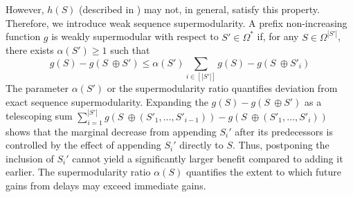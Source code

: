 \documentclass{article} %
\begin{document}
However, $h(S)$ (described in ) may not, in general, satisfy this property. Therefore, we introduce weak sequence supermodularity. A prefix non-increasing function $g$ is weakly supermodular with respect to $S' \in \Omega^*$ if, for any $S \in \Omega^{|S'|}$, there exists $\alpha(S') \geq 1$ such that
\begin{equation}\label{eqn:alpha_supermod}
     g(S) - g(S\ \oplus S') \leq \alpha(S') \sum_{i \in [|S'|]} g(S) - g(S \ \oplus S'_i)
\end{equation}
The parameter $\alpha(S')$ or the supermodularity ratio quantifies deviation from exact sequence supermodularity.
Expanding the $g(S) - g(S\ \oplus S')$ as a telescoping sum 
$\sum_{i = 1}^{|S'|} g(S \ \oplus \left(S'_1, \dots, S'_{i - 1}\right)) - g(S \ \oplus \left(S'_1, \dots, S'_{i}\right))$
shows that the marginal decrease from appending $S_i'$ after its predecessors
is controlled by the effect of appending $S_i'$ directly to $S$. Thus, postponing the inclusion of $S_i'$ cannot yield a significantly larger benefit compared to adding it earlier. The supermodularity ratio $\alpha(S)$ quantifies the extent to which future gains from delays may exceed immediate gains. 

\end{document}
